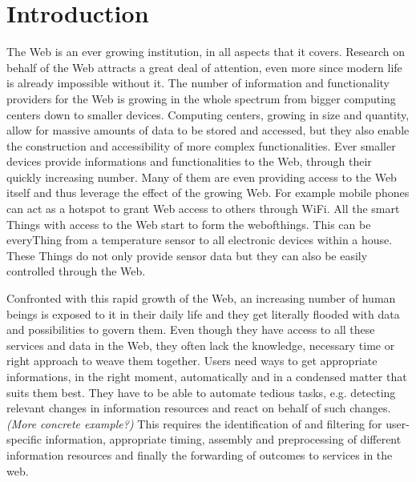 
\chapter{Introduction}


The Web is an ever growing institution, in all aspects that it covers.
Research on behalf of the Web attracts a great deal of attention, even more since modern life is already impossible without it.
The number of information and functionality providers for the Web is growing in the whole spectrum from bigger computing centers down to smaller devices.
Computing centers, growing in size and quantity, allow for massive amounts of data to be stored and accessed, but they also enable the construction and accessibility of more complex functionalities.
Ever smaller devices provide informations and functionalities to the Web, through their quickly increasing number.
Many of them are even providing access to the Web itself and thus leverage the effect of the growing Web.
For example mobile phones can act as a hotspot to grant Web access to others through \textrm{WiFi}.
All the smart \textrm{Things} with access to the Web start to form the \textrm{\gls{webofthings}}.
This can be every\textrm{Thing} from a temperature sensor to all electronic devices within a house.
These \textrm{Things} do not only provide sensor data but they can also be easily controlled through the Web.

Confronted with this rapid growth of the Web, an increasing number of human beings is exposed to it in their daily life and they get literally flooded with data and possibilities to govern them.
Even though they have access to all these services and data in the Web, they often lack the knowledge, necessary time or right approach to weave them together.
Users need ways to get appropriate informations, in the right moment, automatically and in a condensed matter that suits them best.
They have to be able to automate tedious tasks, e.g. detecting relevant changes in information resources and react on behalf of such changes.
\textit{\small{(More concrete example?)}}
This requires the identification of and filtering for user-specific information, appropriate timing, assembly and preprocessing of different information resources and finally the forwarding of outcomes to services in the web. 

